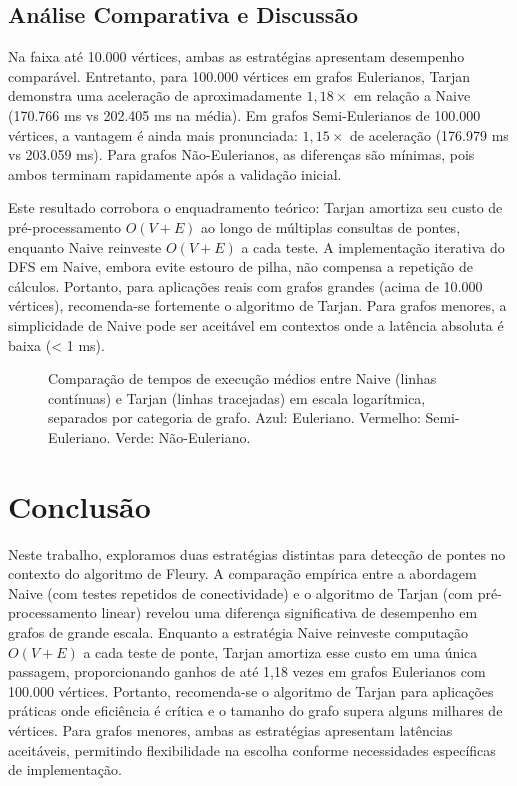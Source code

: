 \documentclass{sbc2023}%
\begin{document}
\subsection{Análise Comparativa e Discussão}

Na faixa até 10.000 vértices, ambas as estratégias apresentam desempenho comparável. Entretanto, para 100.000 vértices em grafos Eulerianos, Tarjan demonstra uma aceleração de aproximadamente $1,18 \times$ em relação a Naive (170.766 ms vs 202.405 ms na média). Em grafos Semi-Eulerianos de 100.000 vértices, a vantagem é ainda mais pronunciada: $1,15 \times$ de aceleração (176.979 ms vs 203.059 ms). Para grafos Não-Eulerianos, as diferenças são mínimas, pois ambos terminam rapidamente após a validação inicial.

Este resultado corrobora o enquadramento teórico: Tarjan amortiza seu custo de pré-processamento $O(V + E)$ ao longo de múltiplas consultas de pontes, enquanto Naive reinveste $O(V + E)$ a cada teste. A implementação iterativa do DFS em Naive, embora evite estouro de pilha, não compensa a repetição de cálculos. Portanto, para aplicações reais com grafos grandes (acima de 10.000 vértices), recomenda-se fortemente o algoritmo de Tarjan. Para grafos menores, a simplicidade de Naive pode ser aceitável em contextos onde a latência absoluta é baixa (< 1 ms).

\begin{figure}[H]
\centering
\resizebox{\columnwidth}{!}{

}
\caption{Comparação de tempos de execução médios entre Naive (linhas contínuas) e Tarjan (linhas tracejadas) em escala logarítmica, separados por categoria de grafo. Azul: Euleriano. Vermelho: Semi-Euleriano. Verde: Não-Euleriano.}
\label{fig:comparacao-desempenho}
\end{figure}


\section{Conclusão}

Neste trabalho, exploramos duas estratégias distintas para detecção de pontes no contexto do algoritmo de Fleury. A comparação empírica entre a abordagem Naive (com testes repetidos de conectividade) e o algoritmo de Tarjan (com pré-processamento linear) revelou uma diferença significativa de desempenho em grafos de grande escala. Enquanto a estratégia Naive reinveste computação $O(V + E)$ a cada teste de ponte, Tarjan amortiza esse custo em uma única passagem, proporcionando ganhos de até 1,18 vezes em grafos Eulerianos com 100.000 vértices. Portanto, recomenda-se o algoritmo de Tarjan para aplicações práticas onde eficiência é crítica e o tamanho do grafo supera alguns milhares de vértices. Para grafos menores, ambas as estratégias apresentam latências aceitáveis, permitindo flexibilidade na escolha conforme necessidades específicas de implementação.
\end{document}
